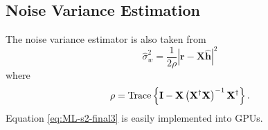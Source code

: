 \subsection{Noise Variance Estimation}
\label{sec:noise_variance_estimation}
The noise variance estimator is also taken from \cite[eq. 9]{rice-afran-saquib-cole-rhodes-moazzami:2014}
\begin{equation}
	\hat{\sigma}_w^2 = \frac{1}{2\rho} \left| \mathbf{r}-\mathbf{X}\hat{\mathbf{h}}\right|^2
	\label{eq:ML-s2-final3}
\end{equation}
where
\begin{equation}
	\rho = {\rm Trace} \left\{ \mathbf{I} -  \mathbf{X}\left(\mathbf{X}^\dag\mathbf{X}\right)^{-1}\mathbf{X}^\dag \right\}.
\end{equation}
Equation \eqref{eq:ML-s2-final3} is easily implemented into GPUs.


